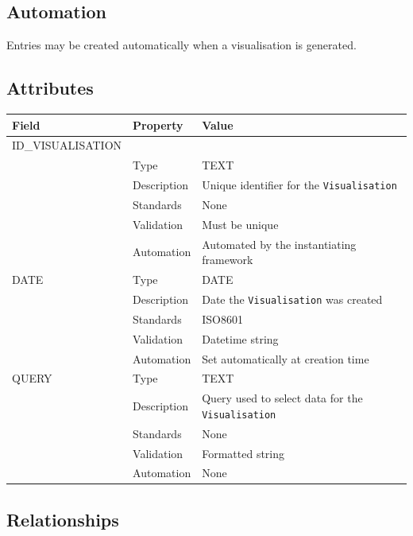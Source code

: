 \documentclass[
]{article}
\newcounter{none}
\begin{document}
\subsection{Automation}\label{automation-41}

Entries may be created automatically when a visualisation is generated.

\subsection{Attributes}\label{attributes-35}

{\def\LTcaptype{none} 
\begin{longtable}[]{@{}lll@{}}
\toprule\noalign{}
Field & Property & Value \\
\midrule\noalign{}
\endhead
\bottomrule\noalign{}
\endlastfoot
ID\_VISUALISATION & & \\
& Type & TEXT \\
& Description & Unique identifier for the \texttt{Visualisation} \\
& Standards & None \\
& Validation & Must be unique \\
& Automation & Automated by the instantiating framework \\
DATE & Type & DATE \\
& Description & Date the \texttt{Visualisation} was created \\
& Standards & ISO8601 \\
& Validation & Datetime string \\
& Automation & Set automatically at creation time \\
QUERY & Type & TEXT \\
& Description & Query used to select data for the
\texttt{Visualisation} \\
& Standards & None \\
& Validation & Formatted string \\
& Automation & None \\
\end{longtable}
}

\subsection{Relationships}\label{relationships-33}
\end{document}
